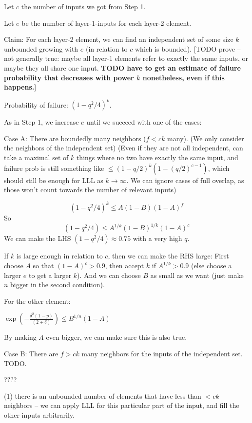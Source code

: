 \documentclass[11pt,a4paper]{article}
\begin{document}
Let $c$ the number of inputs we got from Step 1.

Let $e$ be the number of layer-1-inputs for each layer-2 element.

Claim: For each layer-2 element, we can find an independent set of some size $k$ unbounded growing with $e$ (in relation to $c$ which is bounded). [TODO prove -- not generally true: maybe all layer-1 elements refer to exactly the same inputs, or maybe they all share one input. \textbf{TODO have to get an estimate of failure probability that decreases with power $k$ nonetheless, even if this happens.}]

Probability of failure: $(1-q^2/4)^k$.


As in Step 1, we increase $e$ until we succeed with one of the cases:


Case A: There are boundedly many neighbors ($f < c k$ many). (We only consider the neighbors of the independent set) (Even if they are not all independent, can take a maximal set of $k$ things where no two have exactly the same input, and failure prob is still something like $\leq (1-q/2)^{k} (1-(q/2)^{c-1})$, which should still be enough for LLL as $k \rightarrow \infty$. We can ignore cases of full overlap, as those won't count towards the number of relevant inputs)

\begin{equation}
    (1-q^2/4)^k \leq A(1-B)(1-A)^f
\end{equation}
So
\begin{equation}
    (1-q^2/4) \leq A^{1/k}(1-B)^{1/k}(1-A)^{c}
\end{equation}
We can make the LHS $(1-q^2/4) \approx 0.75$ with a very high $q$.

If $k$ is large enough in relation to $c$, then we can make the RHS large: First choose $A$ so that $(1-A)^c > 0.9$, then accept $k$ if $A^{1/k} > 0.9$ (else choose a larger $e$ to get a larger $k$).
And we can choose $B$ as small as we want (just make $n$ bigger in the second condition).

For the other element:

$ \exp(-\frac{\delta^2(1-p)}{(2+\delta)})  \leq B^{1/n} (1-A)$

By making $A$ even bigger, we can make sure this is also true.

Case B: There are $f > ck$ many neighbors for the inputs of the independent set.
TODO.

????

(1) there is an unbounded number of elements that have less than $< ck$ neighbors -- we can apply LLL for this particular part of the input, and fill the other inputs arbitrarily.
\end{document}
